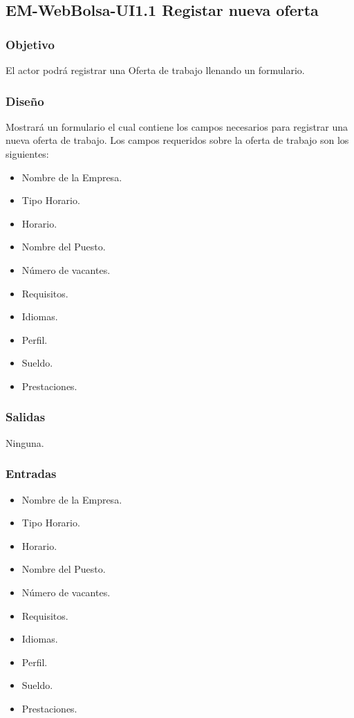 	
\subsection{EM-WebBolsa-UI1.1 Registar nueva oferta}

\subsubsection{Objetivo}
	\noindent
	El actor podrá registrar una Oferta de trabajo llenando un formulario.

\subsubsection{Diseño}
	Mostrará un formulario el cual contiene los campos necesarios para registrar una nueva oferta de trabajo. 
	Los campos requeridos sobre la oferta de trabajo son los siguientes: 
	\begin{itemize}
		\item Nombre de la Empresa.
		\item Tipo Horario.
		\item Horario.
		\item Nombre del Puesto.
		\item Número de vacantes.
		\item Requisitos.
		\item Idiomas.
		\item Perfil.
		\item Sueldo.
		\item Prestaciones. 
	\end{itemize}


\subsubsection{Salidas}
	Ninguna.

\subsubsection{Entradas}
	\begin{itemize}
		\item Nombre de la Empresa.
		\item Tipo Horario.
		\item Horario.
		\item Nombre del Puesto.
		\item Número de vacantes.
		\item Requisitos.
		\item Idiomas.
		\item Perfil.
		\item Sueldo.
		\item Prestaciones. 
	\end{itemize}

